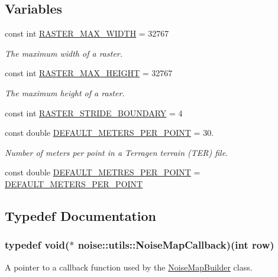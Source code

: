 \subsection*{Variables}
\begin{DoxyCompactItemize}
\item 
const int \hyperlink{namespacenoise_1_1utils_a8cdf12476fffbe356a575674f81bbe0e}{R\+A\+S\+T\+E\+R\+\_\+\+M\+A\+X\+\_\+\+W\+I\+D\+T\+H} = 32767
\begin{DoxyCompactList}\small\item\em The maximum width of a raster. \end{DoxyCompactList}\item 
const int \hyperlink{namespacenoise_1_1utils_a2fe39c4e1a924baee64f610d8fc7573e}{R\+A\+S\+T\+E\+R\+\_\+\+M\+A\+X\+\_\+\+H\+E\+I\+G\+H\+T} = 32767
\begin{DoxyCompactList}\small\item\em The maximum height of a raster. \end{DoxyCompactList}\item 
const int \hyperlink{namespacenoise_1_1utils_a062c3712bd37e604a0ce5c6c3aec0ff1}{R\+A\+S\+T\+E\+R\+\_\+\+S\+T\+R\+I\+D\+E\+\_\+\+B\+O\+U\+N\+D\+A\+R\+Y} = 4
\item 
const double \hyperlink{namespacenoise_1_1utils_a3c693dbdf176e936476e321a63f24859}{D\+E\+F\+A\+U\+L\+T\+\_\+\+M\+E\+T\+E\+R\+S\+\_\+\+P\+E\+R\+\_\+\+P\+O\+I\+N\+T} = 30.
\begin{DoxyCompactList}\small\item\em Number of meters per point in a Terragen terrain (T\+E\+R) file. \end{DoxyCompactList}\item 
const double \hyperlink{namespacenoise_1_1utils_a23e399151147237bb9f7c19503702e36}{D\+E\+F\+A\+U\+L\+T\+\_\+\+M\+E\+T\+R\+E\+S\+\_\+\+P\+E\+R\+\_\+\+P\+O\+I\+N\+T} = \hyperlink{namespacenoise_1_1utils_a3c693dbdf176e936476e321a63f24859}{D\+E\+F\+A\+U\+L\+T\+\_\+\+M\+E\+T\+E\+R\+S\+\_\+\+P\+E\+R\+\_\+\+P\+O\+I\+N\+T}
\end{DoxyCompactItemize}


\subsection{Typedef Documentation}
\hypertarget{namespacenoise_1_1utils_af10741a3394fadf8798a8f40b753b208}{
\subsubsection[{Noise\+Map\+Callback}]{\setlength{\rightskip}{0pt plus 5cm}typedef void($\ast$ noise\+::utils\+::\+Noise\+Map\+Callback)(int row)}}\label{namespacenoise_1_1utils_af10741a3394fadf8798a8f40b753b208}
A pointer to a callback function used by the \hyperlink{classnoise_1_1utils_1_1_noise_map_builder}{Noise\+Map\+Builder} class.


